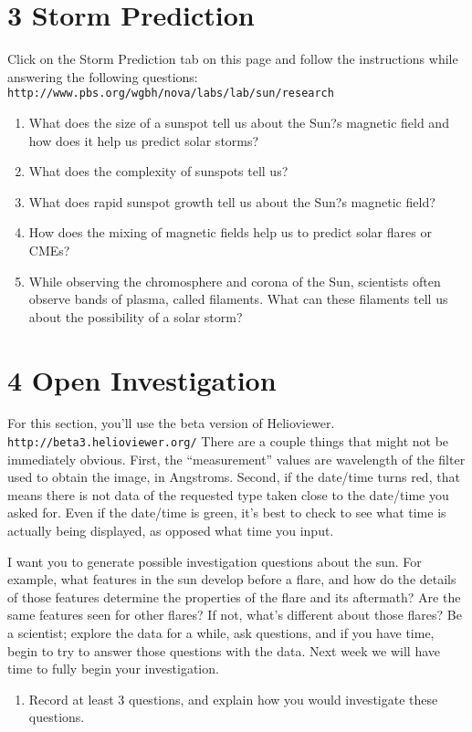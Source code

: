 \documentclass[11pt]{article}%
\begin{document}
\section*{3 Storm Prediction}
Click on the Storm Prediction tab on this page and follow the instructions while answering the following questions: {\tt http://www.pbs.org/wgbh/nova/labs/lab/sun/research}
\begin{enumerate}
\item  What does the size of a sunspot tell us about the Sun?s magnetic field and how does it help us predict solar storms?
\item  What does the complexity of sunspots tell us?
\item What does rapid sunspot growth tell us about the Sun?s magnetic field?
\item  How does the mixing of magnetic fields help us to predict solar flares or CMEs?
\item While observing the chromosphere and corona of the Sun, scientists often observe bands of plasma, called filaments. What can these filaments tell us about the possibility of a solar storm?
\end{enumerate}


\section*{4 Open Investigation}
For this section, you'll use the beta version of Helioviewer. {\tt http://beta3.helioviewer.org/}
There are a couple things that might not be immediately obvious. First, the ``measurement'' values are wavelength of the filter used to obtain the image, in Angstroms. Second, if the date/time turns red, that means there is not data of the requested type taken close to the date/time you asked for. Even if the date/time is green, it's best to check to see what time is actually being displayed, as opposed what time you input. 

I want you to generate possible investigation questions about the sun. For example, what features in the sun develop before a flare, and how do the details of those features determine the properties of the flare and its aftermath? Are the same features seen for other flares? If not, what's different about those flares? Be a scientist; explore the data for a while, ask questions, and if you have time, begin to try to answer those questions with the data. Next week we will have time to fully begin your investigation. \\
\begin{enumerate}
\item Record at least 3 questions, and explain how you would investigate these questions. 
\end{enumerate}
\end{document}
